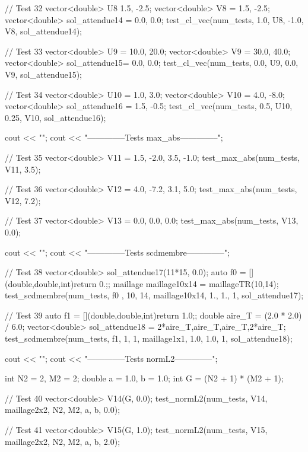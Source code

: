 \begin{codeblock}
{    // Test 32
    vector<double> U8 {1.5, -2.5};
    vector<double> V8 = {1.5, -2.5};
    vector<double> sol_attendue14 = {0.0, 0.0};
    test_cl_vec(num_tests, 1.0, U8, -1.0, V8, sol_attendue14);

    // Test 33
    vector<double> U9 = {10.0, 20.0};
    vector<double> V9 = {30.0, 40.0};
    vector<double> sol_attendue15= {0.0, 0.0};
    test_cl_vec(num_tests, 0.0, U9, 0.0, V9, sol_attendue15);


    // Test 34
    vector<double> U10 = {1.0, 3.0};
    vector<double> V10 = {4.0, -8.0};
    vector<double> sol_attendue16 = {1.5, -0.5};
    test_cl_vec(num_tests, 0.5, U10, 0.25, V10, sol_attendue16);




    cout << "\n\n\n";
    cout << "--------------Tests max_abs--------------\n";

    // Test 35
    vector<double> V11 = {1.5, -2.0, 3.5, -1.0};
    test_max_abs(num_tests, V11, 3.5);

    // Test 36
    vector<double> V12 = {4.0, -7.2, 3.1, 5.0};
    test_max_abs(num_tests, V12, 7.2);

    // Test 37
    vector<double> V13 = {0.0, 0.0, 0.0};
    test_max_abs(num_tests, V13, 0.0);



    cout << "\n\n\n";
    cout << "--------------Tests scdmembre--------------\n";




    // Test 38
    vector<double> sol_attendue17(11*15, 0.0);
    auto f0 = [](double,double,int){return 0.;};
    maillage maillage10x14 = maillageTR(10,14);
    test_scdmembre(num_tests, f0 , 10, 14, maillage10x14, 1., 1., 1, sol_attendue17);



    // Test 39
    auto f1 = [](double,double,int){return 1.0;};
    double aire_T = (2.0 * 2.0) / 6.0;
    vector<double> sol_attendue18 = {2*aire_T,aire_T,aire_T,2*aire_T};
    test_scdmembre(num_tests, f1, 1, 1, maillage1x1, 1.0, 1.0, 1, sol_attendue18);



    cout << "\n\n\n";
    cout << "--------------Tests normL2--------------\n";

    int N2 = 2, M2 = 2;
    double a = 1.0, b = 1.0;
    int G = (N2 + 1) * (M2 + 1);


    // Test 40
    vector<double> V14(G, 0.0);
    test_normL2(num_tests, V14, maillage2x2, N2, M2, a, b, 0.0);

    // Test 41
    vector<double> V15(G, 1.0);
    test_normL2(num_tests, V15, maillage2x2, N2, M2, a, b, 2.0);

}
\end{codeblock}
